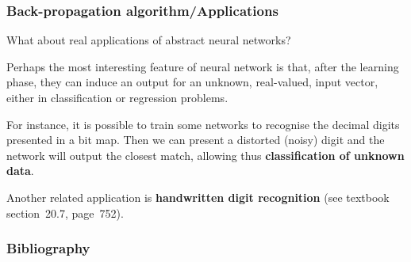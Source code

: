 \documentclass[compress,dvipdfmx]{beamer}
\begin{document}
%
\begin{frame}
\frametitle{Back-propagation algorithm/Applications}

What about real applications of abstract neural networks?

\bigskip

Perhaps the most interesting feature of neural network is that, after
the learning phase, they can induce an output for an unknown,
real-valued, input vector, either in classification or regression
problems.

\bigskip

For instance, it is possible to train some networks to recognise the
decimal digits presented in a bit map. Then we can present a distorted
(noisy) digit and the network will output the closest match, allowing
thus \textbf{classification of unknown data}.

\bigskip

Another related application is \textbf{handwritten digit recognition}
(see textbook section~20.7, page~752).

\end{frame}


%
\begin{frame}
\frametitle{Bibliography}



\nocite{*}

\end{frame}
\end{document}
